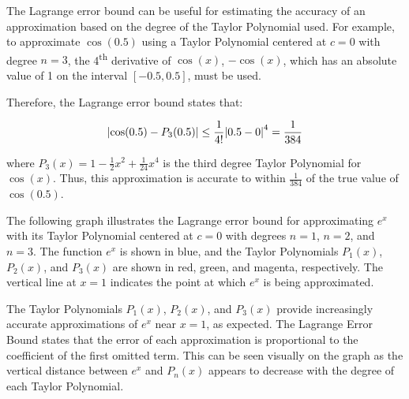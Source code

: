 \documentclass[10pt]{article}
\theoremstyle{definition}
\DeclarePairedDelimiter{\abs}{\lvert}{\rvert}
\begin{document}
The Lagrange error bound can be useful for estimating the accuracy of an approximation based on the degree of the Taylor Polynomial used. For example, to approximate $\cos(0.5)$ using a Taylor Polynomial centered at $c = 0$ with degree $n=3$, the 4\textsuperscript{th} derivative of $\cos(x)$, $-\cos(x)$, which has an absolute value of 1 on the interval $[-0.5, 0.5]$, must be used. 

\newpage

Therefore, the Lagrange error bound states that:

\[\abs*{\cos(0.5) - P_3(0.5)} \leq \frac{1}{4!} \abs*{0.5 - 0}^4 = \frac{1}{384}\]

where $P_3(x) = 1 - \frac{1}{2}x^2 + \frac{1}{24}x^4$ is the third degree Taylor Polynomial for $\cos(x)$. Thus, this approximation is accurate to within $\frac{1}{384}$ of the true value of $\cos(0.5)$.

\vspace{0.3cm}

The following graph illustrates the Lagrange error bound for approximating $e^x$ with its Taylor Polynomial centered at $c = 0$ with degrees $n=1$, $n=2$, and $n=3$. The function $e^x$ is shown in blue, and the Taylor Polynomials $P_1(x)$, $P_2(x)$, and $P_3(x)$ are shown in red, green, and magenta, respectively. The vertical line at $x=1$ indicates the point at which $e^x$ is being approximated.

\begin{center}
\end{center}

The Taylor Polynomials $P_1(x)$, $P_2(x)$, and $P_3(x)$ provide increasingly accurate approximations of $e^x$ near $x=1$, as expected. The Lagrange Error Bound states that the error of each approximation is proportional to the coefficient of the first omitted term. This can be seen visually on the graph as the vertical distance between $e^x$ and $P_n(x)$ appears to decrease with the degree of each Taylor Polynomial.
\end{document}
